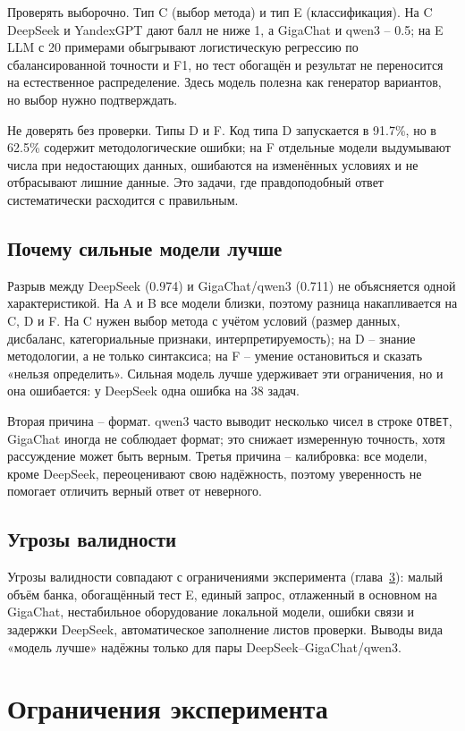\documentclass{bmstu}
\begin{document}
Проверять выборочно. Тип C (выбор метода) и тип E (классификация). На C DeepSeek и YandexGPT дают балл не ниже 1, а GigaChat и qwen3 -- 0.5; на E LLM с 20 примерами обыгрывают логистическую регрессию по сбалансированной точности и F1, но тест обогащён и результат не переносится на естественное распределение. Здесь модель полезна как генератор вариантов, но выбор нужно подтверждать.

Не доверять без проверки. Типы D и F. Код типа D запускается в 91.7\%, но в 62.5\% содержит методологические ошибки; на F отдельные модели выдумывают числа при недостающих данных, ошибаются на изменённых условиях и не отбрасывают лишние данные. Это задачи, где правдоподобный ответ систематически расходится с правильным.

\section{Почему сильные модели лучше}
Разрыв между DeepSeek (0.974) и GigaChat/qwen3 (0.711) не объясняется одной характеристикой. На A и B все модели близки, поэтому разница накапливается на C, D и F. На C нужен выбор метода с учётом условий (размер данных, дисбаланс, категориальные признаки, интерпретируемость); на D -- знание методологии, а не только синтаксиса; на F -- умение остановиться и сказать «нельзя определить». Сильная модель лучше удерживает эти ограничения, но и она ошибается: у DeepSeek одна ошибка на 38 задач.

Вторая причина -- формат. qwen3 часто выводит несколько чисел в строке \texttt{ОТВЕТ}, GigaChat иногда не соблюдает формат; это снижает измеренную точность, хотя рассуждение может быть верным. Третья причина -- калибровка: все модели, кроме DeepSeek, переоценивают свою надёжность, поэтому уверенность не помогает отличить верный ответ от неверного.

\section{Угрозы валидности}
Угрозы валидности совпадают с ограничениями эксперимента (глава~\ref{ch:limits}): малый объём банка, обогащённый тест E, единый запрос, отлаженный в основном на GigaChat, нестабильное оборудование локальной модели, ошибки связи и задержки DeepSeek, автоматическое заполнение листов проверки. Выводы вида «модель лучше» надёжны только для пары DeepSeek--GigaChat/qwen3.

\chapter{Ограничения эксперимента}
\label{ch:limits}
\end{document}
